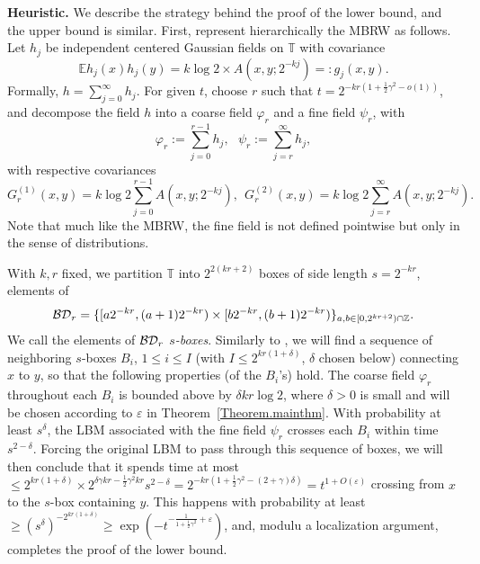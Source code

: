 \documentclass[11pt]{article}
\theoremstyle{definition}
\def \BD {{\cal BD}}
\def \e {\varepsilon}
\def \d {\delta}
\def \E {{\mathbb{E}}}
\def \T {{\mathbb{T}}}
\def \Z {{\mathbb{Z}}}
\begin{document}
\noindent
{\bf Heuristic.} We describe the strategy behind the proof of the lower bound, and the upper bound is similar. First, represent hierarchically the MBRW as follows. Let $h_j$ be independent centered Gaussian fields on $\T$ with covariance
\begin{equation}
  \label{eq-ofer1}
  \E h_j (x) h_j (y) = k \log 2 \times A(x,y; 2^{-kj}) = : g_j (x,y).
\end{equation}
Formally,
$h = \sum_{j=0}^\infty h_j$. For given $t$,
choose $r$ such that $t = 2^{-kr(1 + \frac 1 2 \gamma^2 - o (1))}$,
and decompose the field $h$ into a coarse field $\varphi_r$ and a
fine field $\psi_r$, with
 \begin{equation}
   \label{eq-2}
\varphi_r := \sum_{j=0}^{r-1} h_j , \ \ \ \psi_r := \sum_{j=r}^\infty h_j ,
 \end{equation}
with respective covariances
\begin{equation}
  \label{eq-pg-2}
G^{(1)}_r (x,y) = k \log 2 \sum_{j=0}^{r-1} A(x,y; 2^{-kj}), \  \ G^{(2)}_r (x,y) = k \log 2 \sum_{j=r}^\infty A(x,y; 2^{-kj} ).
\end{equation}
 Note that much like the MBRW, the fine field is not defined pointwise but only
 in the sense of distributions.

With $k,r$ fixed, we partition $\T$ into $2^{2 (k r+2)}$ boxes of side length $s = 2^{- k r} $,
elements of
$$\BD_r=\{[a 2^{-kr}, (a+1)2^{-kr}) \times [b 2^{-kr}, (b+1) 2^{-kr})\}_{
  a, b \in [0 , 2^{kr+2} ) \cap \Z}.$$
    We call the
    elements of $\BD_r$ \textit{$s$-boxes}.
    Similarly to \cite{DZ15},
    we will find a sequence of neighboring $s$-boxes $B_i$, $1 \le i \le I$
    (with $I \le 2^{kr(1 + \d )}$, $\d$ chosen below) connecting $x$ to $y$,
    so that the following properties (of the $B_i$'s) hold.
    The coarse field $\varphi_r$ throughout each $B_i$
    is bounded above by
    $\d kr \log 2$,
    where $\d > 0$ is small and will
    be chosen according to $\e$ in Theorem~\ref{Theorem.mainthm}.
    With probability at least $s^\d$,
    the LBM associated with the fine field $\psi_r$ crosses each $B_i$
    within time
    $s^{2 - \d }$. Forcing the
    original LBM to pass through this sequence of boxes,
    we will then conclude that
    it spends time at most
    $\le 2^{kr(1+ \d )} \times 2^{ \d \gamma k r - \frac 1 2 \gamma^2 k r } s^{2-\d} = 2^{-kr (1 + \frac 1 2 \gamma^2 - (2+\gamma)\d )} = t^{1+O(\e)}$
    crossing
    from $x$ to  the $s$-box containing $y$.
    This happens with probability at least
    $\ge ( s^\d )^{- 2^{kr (1+ \d)} }
    \ge \exp ( - t^{- \frac 1 {1+\frac 1 2 \gamma^2} + \e } ) $, and,
    modulu a localization argument, completes the proof of the lower bound.
\end{document}

